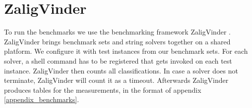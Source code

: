 \section{ZaligVinder}
To run the benchmarks we use the benchmarking framework ZaligVinder \cite{zaligvinder}. ZaligVinder brings benchmark sets and string solvers together on a shared platform. We configure it with test instances from our benchmark sets. For each solver, a shell command has to be registered that gets invoked on each test instance. ZaligVinder then counts all classifications. In case a solver does not terminate, ZaligVinder will count it as a timeout. Afterwards ZaligVinder produces tables for the measurements, in the format of appendix \ref{appendix_benchmarks}.